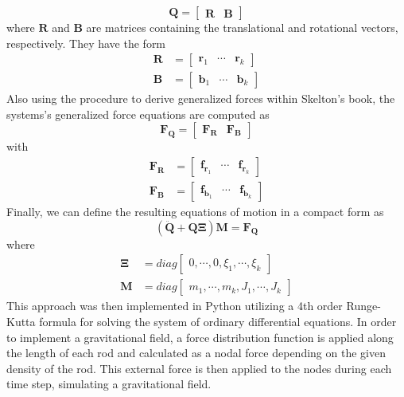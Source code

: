 \begin{equation}
\mathbf{Q} = \begin{bmatrix}
	\mathbf{R} & \mathbf{B}
	\end{bmatrix}\label{eq:configMatrix}
\end{equation}
where \(\mathbf{R}\) and \(\mathbf{B}\) are matrices containing the translational and rotational vectors, respectively. They have the form
\begin{align}
\mathbf{R} &= \begin{bmatrix}
	\mathbf{r}_{1} & \cdots & \mathbf{r}_{k}
	\end{bmatrix}\label{eq:transR}\\
\mathbf{B} &= \begin{bmatrix}
	\mathbf{b}_{1} & \cdots & \mathbf{b}_{k}
	\end{bmatrix}\label{eq:rotB}
\end{align}
Also using the procedure to derive generalized forces within Skelton's book, the systems's generalized force equations are computed as
\begin{equation}
\mathbf{F}_{\mathbf{Q}} = \begin{bmatrix}
	\mathbf{F}_{\mathbf{R}} & \mathbf{F}_{\mathbf{B}}
	\end{bmatrix}\label{eq:generalizedForce}
\end{equation}
with
\begin{align}
\mathbf{F}_{\mathbf{R}} &= \begin{bmatrix}
	\mathbf{f}_{\mathbf{r}_{1}} & \cdots & \mathbf{f}_{\mathbf{r}_{k}}
	\end{bmatrix}\label{eq:gForceR}\\
\mathbf{F}_{\mathbf{B}} &= \begin{bmatrix}
	\mathbf{f}_{\mathbf{b}_{1}} & \cdots & \mathbf{f}_{\mathbf{b}_{k}}
	\end{bmatrix}\label{eq:gForceB}
\end{align}
Finally, we can define the resulting equations of motion in a compact form as
\begin{equation}
(\ddot{\mathbf{Q}} + \mathbf{Q}\mathbf{\Xi})\mathbf{M} = \mathbf{F}_{\mathbf{Q}}\label{eq:compactForm}
\end{equation}
where
\begin{align}
\mathbf{\Xi} &= diag\begin{bmatrix}
	0,\cdots,0,\xi_{1},\cdots,\xi_{k}
	\end{bmatrix}\label{eq:lagrangeMatrix}\\
\mathbf{M} &= diag\begin{bmatrix}
	m_{1},\cdots,m_{k},J_{1},\cdots,J_{k}
	\end{bmatrix}\label{massMatrix}
\end{align}
This approach was then implemented in Python utilizing a 4th order Runge-Kutta formula for solving the system of ordinary differential equations.  
In order to implement a gravitational field, a force distribution function is applied along the length of each rod and calculated as a nodal force depending on the given density of the rod.
This external force is then applied to the nodes during each time step, simulating a gravitational field.

